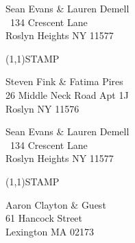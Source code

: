 \documentclass[12pt]{article}
\begin{document}
\begin{minipage}{.5\linewidth} \noindent
Sean Evans \& Lauren Demell\\\ 
134 Crescent Lane\\ 
Roslyn Heights NY 11577
\end{minipage}
\begin{minipage}{.5\linewidth \hspace{-.2in} \vspace{-.3in}}
\begin{flushright}
\framebox(1,1){STAMP}
\end{flushright}
\end{minipage}

\begin{center} \begin{Huge} \vspace*{\fill}
Steven Fink \& Fatima Pires\\
26 Middle Neck Road Apt 1J\\
Roslyn NY 11576\\
\vspace{\fill} \end{Huge} \end{center}

\clearpage

\begin{minipage}{.5\linewidth} \noindent
Sean Evans \& Lauren Demell\\\ 
134 Crescent Lane\\ 
Roslyn Heights NY 11577
\end{minipage}
\begin{minipage}{.5\linewidth \hspace{-.2in} \vspace{-.3in}}
\begin{flushright}
\framebox(1,1){STAMP}
\end{flushright}
\end{minipage}

\begin{center} \begin{Huge} \vspace*{\fill}
Aaron Clayton \& Guest\\
61 Hancock Street\\
Lexington MA 02173\\
\vspace{\fill} \end{Huge} \end{center}

\clearpage
\end{document}
